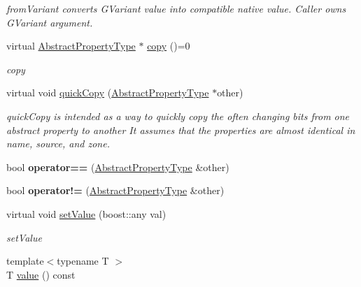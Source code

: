 \begin{DoxyCompactItemize}
\begin{DoxyCompactList}\small\item\em from\-Variant converts G\-Variant value into compatible native value. Caller owns G\-Variant argument. \end{DoxyCompactList}\item 
virtual \hyperlink{classAbstractPropertyType}{Abstract\-Property\-Type} $\ast$ \hyperlink{classAbstractPropertyType_a8fedd4300acc7ba7ada94e964f2fd166}{copy} ()=0
\begin{DoxyCompactList}\small\item\em copy \end{DoxyCompactList}\item 
virtual void \hyperlink{classAbstractPropertyType_a0996989d0082ad3f621fec938b60ed10}{quick\-Copy} (\hyperlink{classAbstractPropertyType}{Abstract\-Property\-Type} $\ast$other)
\begin{DoxyCompactList}\small\item\em quick\-Copy is intended as a way to quickly copy the often changing bits from one abstract property to another It assumes that the properties are almost identical in name, source, and zone. \end{DoxyCompactList}\item 
\hypertarget{classAbstractPropertyType_af156588f45c7b2f2107a8ebb8977e71f}{bool {\bfseries operator==} (\hyperlink{classAbstractPropertyType}{Abstract\-Property\-Type} \&other)}\label{classAbstractPropertyType_af156588f45c7b2f2107a8ebb8977e71f}

\item 
\hypertarget{classAbstractPropertyType_a137d170e61776d59cff141d2df7cab9b}{bool {\bfseries operator!=} (\hyperlink{classAbstractPropertyType}{Abstract\-Property\-Type} \&other)}\label{classAbstractPropertyType_a137d170e61776d59cff141d2df7cab9b}

\item 
virtual void \hyperlink{classAbstractPropertyType_a1b2598b86718911533587a5bd41bfb9c}{set\-Value} (boost\-::any val)
\begin{DoxyCompactList}\small\item\em set\-Value \end{DoxyCompactList}\item 
\hypertarget{classAbstractPropertyType_ae723621925382263eba046fa1ca8e36d}{{\footnotesize template$<$typename T $>$ }\\T \hyperlink{classAbstractPropertyType_ae723621925382263eba046fa1ca8e36d}{value} () const }\label{classAbstractPropertyType_ae723621925382263eba046fa1ca8e36d}


\end{DoxyCompactItemize}

